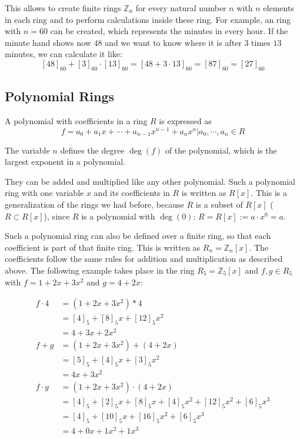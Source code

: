 This allows to create finite rings $\mathbb{Z}_n$ for every natural number $n$ with $n$ elements in each ring and to perform calculations inside these ring. For example, an ring with $n=60$ can be created, which represents the minutes in every hour. If the minute hand shows now $48$ and we want to know where it is after $3$ times $13$ minutes, we can calculate it like:
$$[48]_{60} + [3]_{60}\cdot [13]_{60} = [48+3\cdot 13]_{60} = [87]_{60} = [27]_{60}$$

\subsection*{Polynomial Rings}

A polynomial with coefficients in a ring $R$ is expressed as 
$$f = a_0+ a_1x+\cdots+ a_{n-1}x^{n-1}+a_nx^n | a_0, \cdots, a_n \in R$$

The variable $n$ defines the degree $\deg(f)$ of the polynomial, which is the largest exponent in a polynomial.

They can be added and multiplied like any other polynomial. Such a polynomial ring with one variable $x$ and its coefficients in $R$ is written as $R[x]$. This is a generalization of the rings we had before, because $R$ is a subset of $R[x]$ ($R \subset R[x]$), since $R$ is a polynomial with $\deg(0)$: $R = R[x] := a\cdot x^0 = a$.

Such a polynomial ring can also be defined over a finite ring, so that each coefficient is part of that finite ring. This is written as $R_n = \mathbb{Z}_n[x]$. The coefficients follow the same rules for addition and multiplication as described above. The following example takes place in the ring $R_5 = \mathbb{Z}_5[x]$ and $f, g \in R_5$ with $f=1+2x+3x^2$ and $g=4+2x$:

\begin{align*}
  f\cdot 4 & = (1+2x+3x^2) * 4                                 \\
           & = [4]_5+[8]_5x+[12]_5x^2                          \\
           & = 4+3x+2x^2                                       \\
  f+g      & = (1+2x+3x^2)+(4+2x)                              \\
           & = [5]_5+[4]_5x+[3]_5x^2                           \\
           & = 4x+3x^2                                         \\
  f\cdot g & = (1+2x+3x^2)\cdot(4+2x)                          \\ 
           & = [4]_5+[2]_5x+[8]_5x+[4]_5x^2+[12]_5x^2+[6]_5x^3 \\
           & = [4]_5+[10]_5x+[16]_5x^2+[6]_5x^3                \\
           & = 4+0x+1x^2+1x^3                                  \\
\end{align*}

